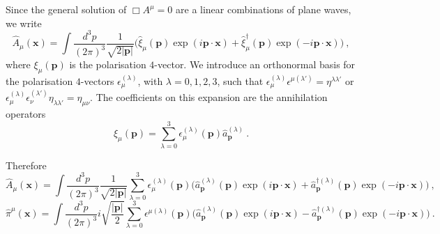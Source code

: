     Since the general solution of $\Box A^\mu = 0$ are a linear combinations of plane waves, we write 
    \begin{equation*}
        \hat A_\mu (\mathbf x) = \int \frac{d^3 p}{(2\pi)^3} \frac{1}{\sqrt{2 |\mathbf p|}} \Big ( \hat \xi_\mu (\mathbf p) \exp(i \mathbf p \cdot \mathbf x) + \hat \xi_\mu^\dagger (\mathbf p) \exp(- i \mathbf p \cdot \mathbf x)) ~,
    \end{equation*}
    where $\xi_\mu (\mathbf p)$ is the polarisation $4$-vector. We introduce an orthonormal basis for the polarisation $4$-vectors $\epsilon_\mu^{(\lambda)}$, with $\lambda = 0, 1, 2, 3$, such that $\epsilon_\mu^{(\lambda)} \epsilon^{\mu (\lambda')} = \eta^{\lambda \lambda'}$ or $\epsilon_\mu^{(\lambda)} \epsilon_\nu^{(\lambda')} \eta_{\lambda \lambda'} = \eta_{\mu\nu}$. The coefficients on this expansion are the annihilation operators
    \begin{equation*}
        \hat \xi_\mu (\mathbf p) = \sum_{\lambda=0}^3 \epsilon_\mu^{(\lambda)} (\mathbf p) \hat a_{\mathbf p}^{(\lambda)} ~.
    \end{equation*}

    Therefore 
    \begin{equation*}
        \hat A_\mu (\mathbf x) = \int \frac{d^3 p}{(2\pi)^3} \frac{1}{\sqrt{2 |\mathbf p|}} \sum_{\lambda=0}^{3} \epsilon_\mu^{(\lambda)} (\mathbf p) \Big ( \hat a_{\mathbf p}^{(\lambda)} (\mathbf p) \exp(i \mathbf p \cdot \mathbf x) + \hat a_{\mathbf p}^{\dagger (\lambda)} (\mathbf p) \exp(- i \mathbf p \cdot \mathbf x) \Big)  ~,
    \end{equation*}
    \begin{equation*}
        \hat \pi^\mu (\mathbf x) = \int \frac{d^3 p}{(2\pi)^3} i \sqrt{\frac{|\mathbf p|}{2}} \sum_{\lambda=0}^{3} \epsilon^{\mu(\lambda)} (\mathbf p) \Big ( \hat a_{\mathbf p}^{(\lambda)} (\mathbf p) \exp(i \mathbf p \cdot \mathbf x) - \hat a_{\mathbf p}^{\dagger (\lambda)} (\mathbf p) \exp(- i \mathbf p \cdot \mathbf x) \Big)  ~.
    \end{equation*}


